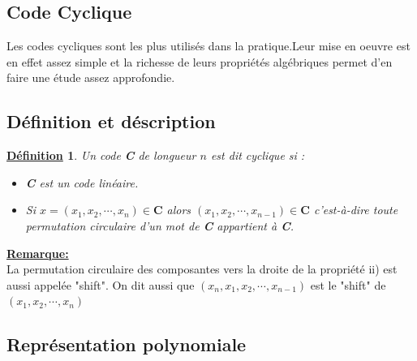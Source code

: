 \documentclass[12pt,openany]{report}
\newtheorem{definition}{\underline{Définition}}
\begin{document}
 \subsection{Code Cyclique}
 
Les codes cycliques sont les plus utilisés dans la pratique.\hspace{0.2cm}Leur mise en oeuvre est en effet assez simple et la richesse de leurs propriétés algébriques permet d'en faire une étude assez approfondie.
\subsection{Définition et déscription}
\begin{definition}

Un code \textbf{C} de longueur $n$ est dit cyclique si :
\begin{itemize}
\item[i)]  \textbf{C} est un code linéaire.
\item[ii)] Si $ x=(x_1,x_2,\cdots,x_n) \in \textbf{C} $ alors $ (x_1,x_2,\cdots,x_{n-1}) \in \textbf{C} $  c'est-à-dire toute permutation circulaire d'un mot de \textbf{C} appartient à \textbf{C}.
\end{itemize}
\end{definition}

\underline{\textbf{Remarque:}}\\
La permutation circulaire des composantes vers la droite de la propriété ii) est aussi appelée "shift". On dit aussi que  $ (x_n,x_1,x_2,\cdots,x_{n-1})$ est le "shift" de $(x_1,x_2,\cdots,x_n)$
\subsection{Représentation polynomiale}
\end{document}
